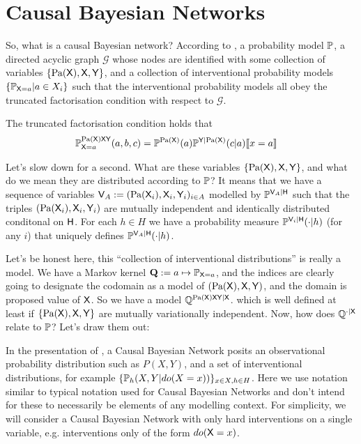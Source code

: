 

\section{Causal Bayesian Networks}\label{sec:CBN}

So, what is a causal Bayesian network? According to \citet{pearl_causality:_2009}, a probability model $\mathbb{P}$, a directed acyclic graph $\mathcal{G}$ whose nodes are identified with some collection of variables $\{\text{Pa}(\mathsf{X}),\mathsf{X},\mathsf{Y}\}$, and a collection of interventional probability models $\{\mathbb{P}_{\mathsf{X}=a}|a\in X_i\}$ such that the interventional probability models all obey the truncated factorisation condition with respect to $\mathcal{G}$.

The truncated factorisation condition holds that
\begin{align}
    \mathbb{P}_{\mathsf{X}=a}^{\text{Pa}(\mathsf{X})\mathsf{X}\mathsf{Y}}(a,b,c) &= \mathbb{P}^{\text{Pa}(\mathsf{X})}(a)\mathbb{P}^{\mathsf{Y}|\text{Pa}(\mathsf{X})}(c|a)\llbracket x=a \rrbracket
\end{align}

Let's slow down for a second. What are these variables $\{\text{Pa}(\mathsf{X}),\mathsf{X},\mathsf{Y}\}$, and what do we mean they are distributed according to $\mathbb{P}$? It means that we have a sequence of variables $\mathsf{V}_A:=(\text{Pa}(\mathsf{X}_i),\mathsf{X}_i,\mathsf{Y}_i)_{i\in A}$ modelled by $\mathbb{P}^{\mathsf{V}_A|\mathsf{H}}$ such that the triples $(\text{Pa}(\mathsf{X}_i),\mathsf{X}_i,\mathsf{Y}_i)$ are mutually independent and identically distributed conditonal on $\mathsf{H}$. For each $h\in H$ we have a probability measure $\mathbb{P}^{\mathsf{V}_i|\mathsf{H}}(\cdot|h)$ (for any $i$) that uniquely defines $\mathbb{P}^{\mathsf{V}_A|\mathsf{H}}(\cdot|h)$. 



Let's be honest here, this ``collection of interventional distributions'' is really a model. We have a Markov kernel $\mathbf{Q}:=a\mapsto \mathbb{P}_{\mathsf{X}=a}$, and the indices are clearly going to designate the codomain as a model of $(\text{Pa}(\mathsf{X}),\mathsf{X},\mathsf{Y})$, and the domain is proposed value of $\mathsf{X}$. So we have a model $\mathbb{Q}^{\text{Pa}(\mathsf{X})\mathsf{X}\mathsf{Y}|\mathsf{X}}$.  which is well defined at least if $\{\text{Pa}(\mathsf{X}),\mathsf{X},\mathsf{Y}\}$ are mutually variationally independent. Now, how does $\mathbb{Q}^{\cdot|\mathsf{X}}$ relate to $\mathbb{P}$? Let's draw them out:



In the presentation of \citet{pearl_causality:_2009}, a Causal Bayesian Network posits an observational probability distribution such as $P(X,Y)$, and a set of interventional distributions, for example $\{\mathbb{P}_h(X,Y|do(X=x))\}_{x\in X,h\in H}$. Here we use notation similar to typical notation used for Causal Bayesian Networks and don't intend for these to necessarily be elements of any modelling context. For simplicity, we will consider a Causal Bayesian Network with only hard interventions on a single variable, e.g. interventions only of the form $do(\mathsf{X}=x)$.

